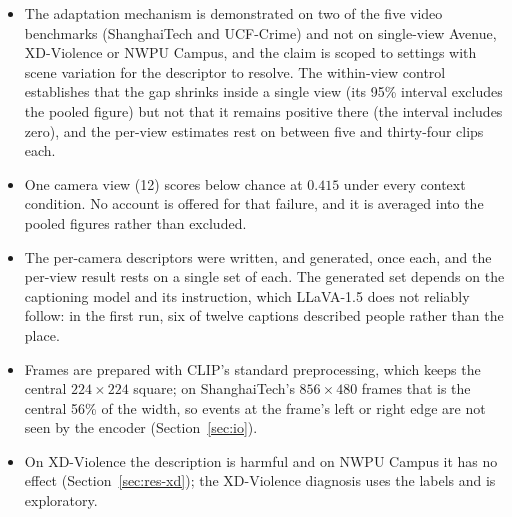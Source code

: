 \documentclass[a4paper,fleqn]{cas-sc}
\begin{document}
\begin{itemize}
        partitions with their spread, and the spread is comparable to the
        margins separating the leading configurations---which are consequently
        reported as tied rather than ranked.
  \item The adaptation mechanism is demonstrated on two of the five video
        benchmarks (ShanghaiTech and UCF-Crime) and not on single-view Avenue,
        XD-Violence or NWPU Campus,
        and the claim is scoped to settings with scene variation for
        the descriptor to resolve. The within-view control establishes that the
        gap shrinks inside a single view (its 95\% interval excludes the pooled
        figure) but not that it remains positive there (the interval includes
        zero), and the per-view estimates rest on between five and thirty-four
        clips each.
  \item One camera view (12) scores below chance at $0.415$ under every context
        condition. No account is offered for that failure, and it is averaged
        into the pooled figures rather than excluded.
  \item The per-camera descriptors were written, and generated, once each, and
        the per-view result rests on a single set of each. The generated set
        depends on the captioning model and its instruction, which LLaVA-1.5
        does not reliably follow: in the first run, six of twelve captions
        described people rather than the place.
  \item Frames are prepared with CLIP's standard preprocessing, which keeps the
        central $224\times224$ square; on ShanghaiTech's $856\times480$ frames that
        is the central 56\% of the width, so events at the frame's left or right
        edge are not seen by the encoder (Section~\ref{sec:io}).
  \item On XD-Violence the description is harmful and on NWPU Campus it has no
        effect (Section~\ref{sec:res-xd}); the XD-Violence diagnosis uses the
        labels and is exploratory.
\end{itemize}
\end{document}
